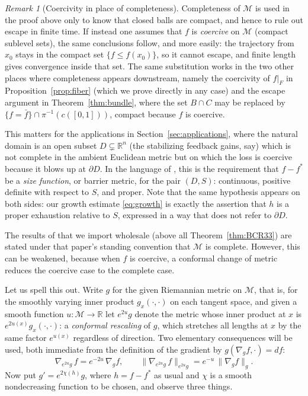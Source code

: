\documentclass[11pt]{article}
\theoremstyle{plain}
\theoremstyle{definition}
\theoremstyle{remark}
\newtheorem{rem}[thm]{Remark}
\newcommand{\M}{\mathcal{M}}
\newcommand{\R}{\mathbb{R}}
\begin{document}
\begin{rem}[Coercivity in place of completeness]\label{rem:coercive}
Completeness of $\M$ is used in the proof above only to know that closed balls
are compact, and hence to rule out escape in finite time. If instead one assumes
that $f$ is \emph{coercive} on $\M$ (compact sublevel sets), the same conclusions
follow, and more easily: the trajectory from $x_0$ stays in the compact set
$\{f\le f(x_0)\}$, so it cannot escape, and finite length gives convergence
inside that set. The same substitution works in the two other places where
completeness appears downstream, namely the coercivity of $f|_F$ in
Proposition~\ref{prop:fiber} (which we prove directly in any case) and the escape
argument in Theorem~\ref{thm:bundle}, where the set $B\cap C$ may be replaced by
$\{f=\bar f\}\cap\pi^{-1}(c([0,1]))$, compact because $f$ is coercive.

This matters for the applications in Section~\ref{sec:applications}, where the
natural domain is an open subset $D\subsetneq\R^{n}$ (the stabilizing feedback
gains, say) which is not complete in the ambient Euclidean metric but on which
the loss is coercive because it blows up at $\partial D$. In the language of
\cite{Sontag2025L4DC, Sontag2022}, this is the requirement that $f-f^*$ be a
\emph{size function}, or barrier metric, for the pair $(D,S)$: continuous,
positive definite with respect to $S$, and proper. Note that the same hypothesis
appears on both sides: our growth estimate \eqref{eq:growth} is exactly the
assertion that $h$ is a proper exhaustion relative to $S$, expressed in a way that
does not refer to $\partial D$.

The results of \cite{BCR2026} that we import wholesale (above all
Theorem~\ref{thm:BCR33}) are stated under that paper's standing convention that
$\M$ is complete. However, this can be weakened, because when $f$ is coercive, a
conformal change of metric reduces the coercive case to the complete case.

Let us spell this out. Write $g$ for the given Riemannian metric on $\M$, that is,
for the smoothly varying inner product $g_x(\cdot,\cdot)$ on each tangent space,
and given a smooth function $u\colon\M\to\R$ let $e^{2u}g$ denote the metric whose
inner product at $x$ is $e^{2u(x)}g_x(\cdot,\cdot)$: a \emph{conformal rescaling}
of $g$, which stretches all lengths at $x$ by the same factor $e^{u(x)}$
regardless of direction. Two elementary consequences will be used, both immediate
from the definition of the gradient by $g(\nabla_g f,\cdot) = df$:
\[
  \nabla_{e^{2u}g}\,f = e^{-2u}\,\nabla_g f ,
  \qquad
  \|\nabla_{e^{2u}g}\,f\|_{e^{2u}g} = e^{-u}\,\|\nabla_g f\|_g .
\]
Now put $g' = e^{2\chi(h)}g$, where $h=f-f^*$ as usual and $\chi$ is a smooth
nondecreasing function to be chosen, and observe three things.


\end{rem}
\end{document}
